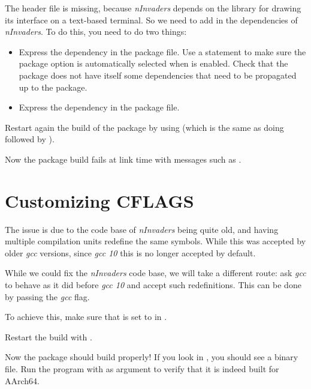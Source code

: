 The  header file is missing, because {\em nInvaders}
depends on the  library for drawing its interface on a
text-based terminal. So we need to add  in the
dependencies of {\em nInvaders}. To do this, you need to do two
things:

\begin{itemize}

\item Express the dependency in the package  file. Use
  a  statement to make sure the  package
  option is automatically selected when  is
  enabled. Check that the  package does not have itself
  some dependencies that need to be propagated up to the
   package.

\item Express the dependency in the package  file.

\end{itemize}

Restart again the build of the package by using
 (which is the same as doing
 followed by ).

Now the package build fails at link time with messages such as
.

\section{Customizing CFLAGS}

The  issue is due to the code base of {\em
  nInvaders} being quite old, and having multiple compilation units
redefine the same symbols. While this was accepted by older {\em gcc}
versions, since {\em gcc 10} this is no longer accepted by default.

While we could fix the {\em nInvaders} code base, we will take a
different route: ask {\em gcc} to behave as it did before {\em gcc 10}
and accept such redefinitions. This can be done by passing the
 {\em gcc} flag.

To achieve this, make sure that  is set to
 in .

Restart the build with .

Now the package should build properly! If you look in
, you should see a
 binary file. Run the  program with
 as argument to verify that it is indeed built for
AArch64.

